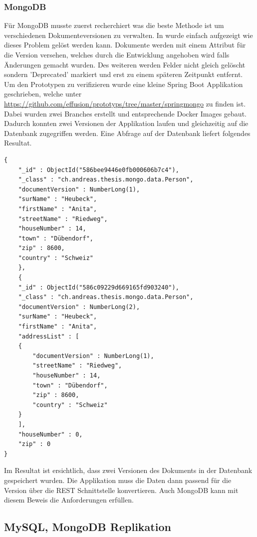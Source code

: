 \subsubsection{MongoDB}

Für MongoDB musste zuerst recherchiert was die beste Methode ist um verschiedenen Dokumenteversionen zu verwalten. In \cite{mongoschema} wurde einfach aufgezeigt wie dieses Problem gelöst werden kann. Dokumente werden mit einem Attribut für die Version versehen, welches durch die Entwicklung angehoben wird falls Änderungen gemacht wurden. Des weiteren werden Felder nicht gleich gelöscht sondern 'Deprecated' markiert und erst zu einem späteren Zeitpunkt entfernt. Um den Prototypen zu verifizieren wurde eine kleine Spring Boot Applikation geschrieben, welche unter \url{https://github.com/effusion/prototyps/tree/master/springmongo} zu finden ist. Dabei wurden zwei Branches erstellt und entsprechende Docker Images gebaut. Dadurch konnten zwei Versionen der Applikation laufen und gleichzeitig auf die Datenbank zugegriffen werden. 
Eine Abfrage auf der Datenbank liefert folgendes Resultat.


\begin{lstlisting}
{
	"_id" : ObjectId("586bee9446e0fb000606b7c4"),
	"_class" : "ch.andreas.thesis.mongo.data.Person",
	"documentVersion" : NumberLong(1),
	"surName" : "Heubeck",
	"firstName" : "Anita",
	"streetName" : "Riedweg",
	"houseNumber" : 14,
	"town" : "Dübendorf",
	"zip" : 8600,
	"country" : "Schweiz"
	},
	{
	"_id" : ObjectId("586c09229d669165fd903240"),
	"_class" : "ch.andreas.thesis.mongo.data.Person",
	"documentVersion" : NumberLong(2),
	"surName" : "Heubeck",
	"firstName" : "Anita",
	"addressList" : [
	{
		"documentVersion" : NumberLong(1),
		"streetName" : "Riedweg",
		"houseNumber" : 14,
		"town" : "Dübendorf",
		"zip" : 8600,
		"country" : "Schweiz"
	}	
	],
	"houseNumber" : 0,
	"zip" : 0
}
\end{lstlisting}
Im Resultat ist ersichtlich, dass zwei Versionen des Dokuments in der Datenbank gespeichert wurden. Die Applikation muss die Daten dann passend für die Version über die REST Schnittstelle konvertieren. Auch MongoDB kann mit diesem Beweis die Anforderungen erfüllen.

\subsection{MySQL, MongoDB Replikation}

